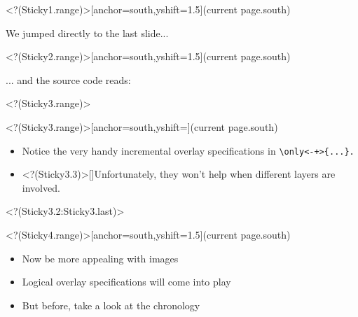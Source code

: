\Sticky<?(Sticky1.range)>[anchor=south,yshift=1.5\baselineskip](current page.south){\bfseries\begin{minipage}{0.66\textwidth} We jumped directly to the last slide...\end{minipage}}
\Sticky<?(Sticky2.range)>[anchor=south,yshift=1.5\baselineskip](current page.south){\bfseries\begin{minipage}{0.66\textwidth} ... and the source code reads:\end{minipage}}
\visible<?(Sticky3.range)>{
\Sticky<?(Sticky3.range)>[anchor=south,yshift=\baselineskip](current page.south){\bfseries\begin{minipage}{0.9\textwidth}
\begin{itemize}
\item [\myBulb]Notice the very handy incremental overlay specifications in
%
\texttt{\color{MyGreen}\backslash only<-+>\{...\}.%
}
\item<?(Sticky3.3)>[\myBulb]Unfortunately, they won't help when different layers are involved.
\end{itemize}
\end{minipage}
}}
\only<?(Sticky3.2:Sticky3.last)>{
}

%
\Sticky<?(Sticky4.range)>[anchor=south,yshift=1.5\baselineskip](current page.south){\bfseries\begin{minipage}{0.7\textwidth}
\begin{itemize}[<?(Sticky4++)->]
\item[\myBulb] Now be more appealing with images
\item[\myBulb] Logical overlay specifications will come into play
\item[\myBulb] But before, take a look at the chronology
\end{itemize}
\end{minipage}
}
